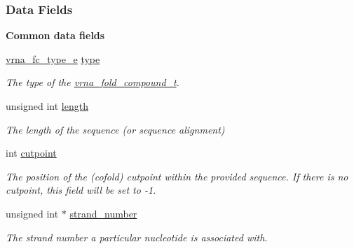 \subsubsection*{Data Fields}
\begin{Indent}\textbf{ Common data fields}\par
\begin{DoxyCompactItemize}
\item 
\hyperlink{group__fold__compound_ga01a4ff86fa71deaaa5d1abbd95a1447d}{vrna\+\_\+fc\+\_\+type\+\_\+e} \hyperlink{group__fold__compound_ac5eab693deac9a1a40c2a95ac294707c}{type}
\begin{DoxyCompactList}\small\item\em The type of the \hyperlink{group__fold__compound_ga1b0cef17fd40466cef5968eaeeff6166}{vrna\+\_\+fold\+\_\+compound\+\_\+t}. \end{DoxyCompactList}\item 
\mbox{\label{group__fold__compound_a95fbfed770b858e50c766505dc4bf998}} 
unsigned int \hyperlink{group__fold__compound_a95fbfed770b858e50c766505dc4bf998}{length}
\begin{DoxyCompactList}\small\item\em The length of the sequence (or sequence alignment) \end{DoxyCompactList}\item 
\mbox{\label{group__fold__compound_ae1a7bbff0256577e2b22709bac11fdb4}} 
int \hyperlink{group__fold__compound_ae1a7bbff0256577e2b22709bac11fdb4}{cutpoint}
\begin{DoxyCompactList}\small\item\em The position of the (cofold) cutpoint within the provided sequence. If there is no cutpoint, this field will be set to -\/1. \end{DoxyCompactList}\item 
\mbox{\label{group__fold__compound_a23304c5186dfae97bc69dc19d37f70c3}} 
unsigned int $\ast$ \hyperlink{group__fold__compound_a23304c5186dfae97bc69dc19d37f70c3}{strand\+\_\+number}
\begin{DoxyCompactList}\small\item\em The strand number a particular nucleotide is associated with. \end{DoxyCompactList}\item 
\mbox{\label{group__fold__compound_aceaa904dbf50092d403ca99422e8f824}} 

\end{DoxyCompactItemize}
\end{Indent}
